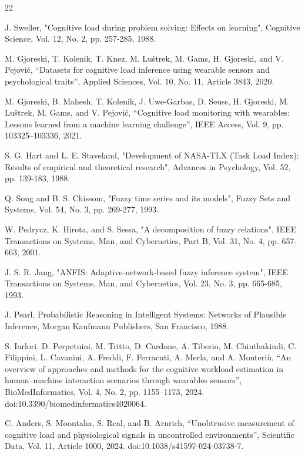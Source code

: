 \documentclass[runningheads]{llncs}
\begin{document}
\begin{thebibliography}{22}

 J. Sweller, "Cognitive load during problem solving: Effects on learning", Cognitive Science, Vol. 12, No. 2, pp. 257-285, 1988.

 M. Gjoreski, T. Kolenik, T. Knez, M. Luštrek, M. Gams, H. Gjoreski, and V. Pejović, ``Datasets for cognitive load inference using wearable sensors and psychological traits'', Applied Sciences, Vol. 10, No. 11, Article 3843, 2020.

 M. Gjoreski, B. Mahesh, T. Kolenik, J. Uwe-Garbas, D. Seuss, H. Gjoreski, M. Luštrek, M. Gams, and V. Pejović, ``Cognitive load monitoring with wearables: Lessons learned from a machine learning challenge'', IEEE Access, Vol. 9, pp. 103325--103336, 2021.

 S. G. Hart and L. E. Staveland, "Development of NASA-TLX (Task Load Index): Results of empirical and theoretical research", Advances in Psychology, Vol. 52, pp. 139-183, 1988.

 Q. Song and B. S. Chissom, "Fuzzy time series and its models", Fuzzy Sets and Systems, Vol. 54, No. 3, pp. 269-277, 1993.

 W. Pedrycz, K. Hirota, and S. Sessa, "A decomposition of fuzzy relations", IEEE Transactions on Systems, Man, and Cybernetics, Part B, Vol. 31, No. 4, pp. 657-663, 2001.

 J. S. R. Jang, "ANFIS: Adaptive-network-based fuzzy inference system", IEEE Transactions on Systems, Man, and Cybernetics, Vol. 23, No. 3, pp. 665-685, 1993.

 J. Pearl, Probabilistic Reasoning in Intelligent Systems: Networks of Plausible Inference, Morgan Kaufmann Publishers, San Francisco, 1988.

 S. Iarlori, D. Perpetuini, M. Tritto, D. Cardone, A. Tiberio, M. Chinthakindi, C. Filippini, L. Cavanini, A. Freddi, F. Ferracuti, A. Merla, and A. Monteriù, ``An overview of approaches and methods for the cognitive workload estimation in human--machine interaction scenarios through wearables sensors'', BioMedInformatics, Vol. 4, No. 2, pp. 1155--1173, 2024. doi:10.3390/biomedinformatics4020064.

 C. Anders, S. Moontaha, S. Real, and B. Arnrich, ``Unobtrusive measurement of cognitive load and physiological signals in uncontrolled environments'', Scientific Data, Vol. 11, Article 1000, 2024. doi:10.1038/s41597-024-03738-7.


\end{thebibliography}
\end{document}
